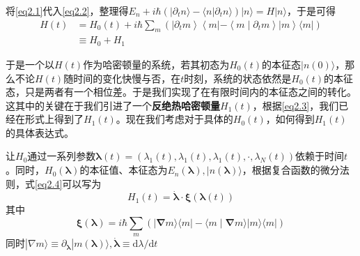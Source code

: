 将\ref{eq2.1}代入\ref{eq2.2}，整理得$ E_{n}+ i \hbar \left( | \partial_{t} n \rangle -\langle n | \partial_t n \rangle\right)|n\rangle=H| n\rangle$，于是可得
\begin{align}
    \nonumber H(t)&=H_{0}(t)+i \hbar \sum_{m}\left(\left|\partial_{t} m\right\rangle\left\langle m\left|-\left\langle m \mid \partial_{t} m\right\rangle\right| m\right\rangle\langle m|\right) \\
    &\equiv H_0 + H_1
    \label{eq2.3} 
\end{align}

于是一个以$H (t)$作为哈密顿量的系统，若其初态为$H_0 (t)$的本征态$| n(0) \rangle$，那么不论$H (t)$随时间的变化快慢与否，在$t$时刻，系统的状态依然是$H_0 (t)$的本征态，只是两者有一个相位差。于是我们实现了在有限时间内的本征态之间的转化。这其中的关键在于我们引进了一个\textbf{反绝热哈密顿量}$H_1 (t)$，根据\ref{eq2.3}，我们已经在形式上得到了$H_1 (t)$。现在我们考虑对于具体的$H_0 (t)$，如何得到$H_1 (t)$的具体表达式。\cite{Jarzynski2013}

让$H_0$通过一系列参数$\bm{\lambda}(t)=\left( \lambda_1 (t) , \lambda_1 (t) , \lambda_1 (t) , \cdot , \lambda_{N} (t) \right)$依赖于时间$t$。同时，$H_0 (\bm{\lambda})$的本征值、本征态为$E_n (\bm{\lambda}), | n (\bm{\lambda}) \rangle$，根据复合函数的微分法则，式\ref{eq2.4}可以写为
\begin{equation}
    H_1 (t)=\dot{\boldsymbol{\lambda}} \cdot \boldsymbol{\xi}(\boldsymbol{\lambda}(t))
    \label{eq2.5}
\end{equation}
其中
\begin{equation}
    \boldsymbol{\xi}(\boldsymbol{\lambda})=i \hbar \sum_{m}(|\boldsymbol{\nabla} m\rangle\langle m|-\langle m \mid \boldsymbol{\nabla} m\rangle| m\rangle\langle m|)
    \label{eq2.4}
\end{equation}
同时$|\nabla m\rangle \equiv \partial_{\boldsymbol{\lambda}}|m(\boldsymbol{\lambda})\rangle  , \dot{\boldsymbol{\lambda}} \equiv \mathrm{d} \lambda / \mathrm{d} t$

